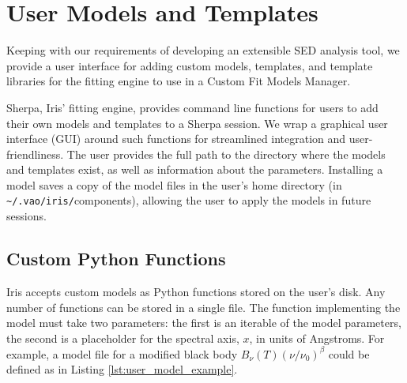\documentclass[preprint,authoryear,5p]{elsarticle}
\begin{document}

\section{User Models and Templates} \label{sec:usermodels}

Keeping with our requirements of developing an extensible SED analysis tool, we
provide a user interface for adding custom models, templates, and template
libraries for the fitting engine to use in a Custom Fit Models Manager.

\begin{sloppypar}
Sherpa, Iris' fitting engine, provides command line functions for users to add
their own models and templates to a Sherpa session. We wrap a graphical user 
interface (GUI) around such functions for streamlined integration and 
user-friendliness.
The user provides the full path to the directory where the models and templates
exist, as well as information about the parameters. Installing a model saves a
copy of the model files in the user's home directory (in
\texttt{\~{}/.vao/iris/}components), allowing the user to apply the models in future
sessions.
\end{sloppypar}

\subsection{Custom Python Functions} Iris accepts custom models as Python
functions stored on the user's disk. Any number of functions can be stored in a
single file. The function implementing the model must take two parameters: the
first is an iterable of the model parameters, the second is a placeholder for
the spectral axis, $x$, in units of Angstroms. For example, a model file for a
modified black body \(B_{\nu}(T) \left(\nu/\nu_{0}\right)^{\beta}\) could be
defined as in Listing \ref{lst:user_model_example}.
\end{document}
